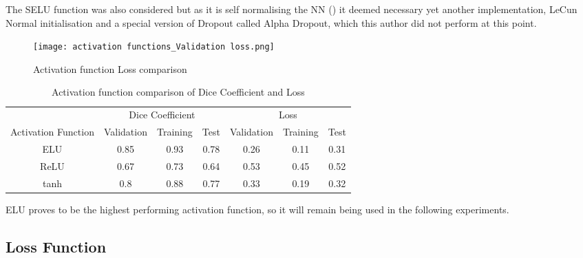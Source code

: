 The \gls{SELU} function was also considered but as it is self normalising the \gls{NN} (\cite{klambauer2017selfnormalizing}) it deemed necessary yet another implementation, LeCun Normal initialisation and a special version of Dropout called Alpha Dropout, which this author did not perform at this point.

\begin{figure}[hbt!]
    \centering
    \texttt{[image: activation functions\_Validation loss.png]}
    \caption{Activation function Loss comparison}
    \label{act_dice}
\end{figure}

\begin{table}[ht!]
    \begin{center}
    \begin{tabular}{ccccccc}
        \toprule
       & \multicolumn{3}{c}{Dice Coefficient}     & \multicolumn{3}{c}{Loss} \\
    Activation Function & Validation & Training & Test & Validation    & Training & Test   \\ 
    \rowcolor{lightgray} \gls{ELU} & 0.85 & 0.93 & 0.78 & 0.26 & 0.11 & 0.31  \\ \gls{ReLU} & 0.67 & 0.73 & 0.64 & 0.53 & 0.45 & 0.52  \\ tanh & 0.8 & 0.88 & 0.77 & 0.33 & 0.19 & 0.32  \\
                    \bottomrule
    \end{tabular}
    \caption{Activation function comparison of Dice Coefficient and Loss} \label{tab_act}
  \end{center}
\end{table}

\gls{ELU} proves to be the highest performing activation function, so it will remain being used in the following experiments.

\subsection{Loss Function} \label{loss_exp}
